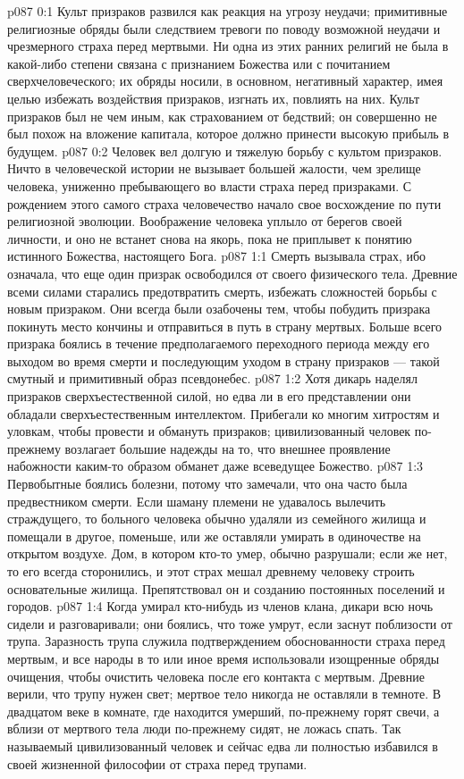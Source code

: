 \vs p087 0:1 Культ призраков развился как реакция на угрозу неудачи; примитивные религиозные обряды были следствием тревоги по поводу возможной неудачи и чрезмерного страха перед мертвыми. Ни одна из этих ранних религий не была в какой\hyp{}либо степени связана с признанием Божества или с почитанием сверхчеловеческого; их обряды носили, в основном, негативный характер, имея целью избежать воздействия призраков, изгнать их, повлиять на них. Культ призраков был не чем иным, как страхованием от бедствий; он совершенно не был похож на вложение капитала, которое должно принести высокую прибыль в будущем.
\vs p087 0:2 Человек вел долгую и тяжелую борьбу с культом призраков. Ничто в человеческой истории не вызывает большей жалости, чем зрелище человека, униженно пребывающего во власти страха перед призраками. С рождением этого самого страха человечество начало свое восхождение по пути религиозной эволюции. Воображение человека уплыло от берегов своей личности, и оно не встанет снова на якорь, пока не приплывет к понятию истинного Божества, настоящего Бога.
\vs p087 1:1 Смерть вызывала страх, ибо означала, что еще один призрак освободился от своего физического тела. Древние всеми силами старались предотвратить смерть, избежать сложностей борьбы с новым призраком. Они всегда были озабочены тем, чтобы побудить призрака покинуть место кончины и отправиться в путь в страну мертвых. Больше всего призрака боялись в течение предполагаемого переходного периода между его выходом во время смерти и последующим уходом в страну призраков --- такой смутный и примитивный образ псевдонебес.
\vs p087 1:2 Хотя дикарь наделял призраков сверхъестественной силой, но едва ли в его представлении они обладали сверхъестественным интеллектом. Прибегали ко многим хитростям и уловкам, чтобы провести и обмануть призраков; цивилизованный человек по\hyp{}прежнему возлагает большие надежды на то, что внешнее проявление набожности каким\hyp{}то образом обманет даже всеведущее Божество.
\vs p087 1:3 Первобытные боялись болезни, потому что замечали, что она часто была предвестником смерти. Если шаману племени не удавалось вылечить страждущего, то больного человека обычно удаляли из семейного жилища и помещали в другое, поменьше, или же оставляли умирать в одиночестве на открытом воздухе. Дом, в котором кто\hyp{}то умер, обычно разрушали; если же нет, то его всегда сторонились, и этот страх мешал древнему человеку строить основательные жилища. Препятствовал он и созданию постоянных поселений и городов.
\vs p087 1:4 Когда умирал кто\hyp{}нибудь из членов клана, дикари всю ночь сидели и разговаривали; они боялись, что тоже умрут, если заснут поблизости от трупа. Заразность трупа служила подтверждением обоснованности страха перед мертвым, и все народы в то или иное время использовали изощренные обряды очищения, чтобы очистить человека после его контакта с мертвым. Древние верили, что трупу нужен свет; мертвое тело никогда не оставляли в темноте. В двадцатом веке в комнате, где находится умерший, по\hyp{}прежнему горят свечи, а вблизи от мертвого тела люди по\hyp{}прежнему сидят, не ложась спать. Так называемый цивилизованный человек и сейчас едва ли полностью избавился в своей жизненной философии от страха перед трупами.
